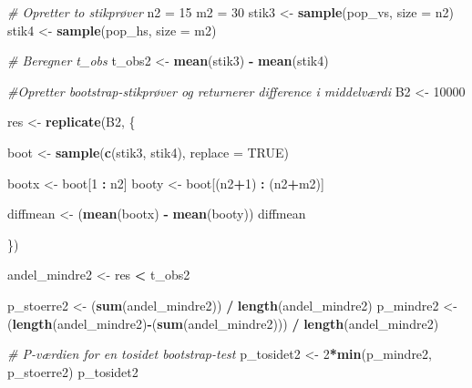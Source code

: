 \documentclass[
]{book}
\newenvironment{Shaded}{\begin{snugshade}}{\end{snugshade}}
\newcommand{\CommentTok}[1]{\textcolor[rgb]{0.56,0.35,0.01}{\textit{#1}}}
\newcommand{\DataTypeTok}[1]{\textcolor[rgb]{0.13,0.29,0.53}{#1}}
\newcommand{\DecValTok}[1]{\textcolor[rgb]{0.00,0.00,0.81}{#1}}
\newcommand{\KeywordTok}[1]{\textcolor[rgb]{0.13,0.29,0.53}{\textbf{#1}}}
\newcommand{\NormalTok}[1]{#1}
\newcommand{\OperatorTok}[1]{\textcolor[rgb]{0.81,0.36,0.00}{\textbf{#1}}}
\newcommand{\OtherTok}[1]{\textcolor[rgb]{0.56,0.35,0.01}{#1}}
\newcommand{\StringTok}[1]{\textcolor[rgb]{0.31,0.60,0.02}{#1}}
\theoremstyle{definition}
\theoremstyle{definition}
\theoremstyle{definition}
\theoremstyle{remark}
\begin{document}
\begin{Shaded}
\begin{Highlighting}[]
\CommentTok{# Opretter to stikprøver}
\NormalTok{n2 =}\StringTok{ }\DecValTok{15}
\NormalTok{m2 =}\StringTok{ }\DecValTok{30}
\NormalTok{stik3 <-}\StringTok{ }\KeywordTok{sample}\NormalTok{(pop_vs, }\DataTypeTok{size =}\NormalTok{ n2)}
\NormalTok{stik4 <-}\StringTok{ }\KeywordTok{sample}\NormalTok{(pop_hs, }\DataTypeTok{size =}\NormalTok{ m2)}

\CommentTok{# Beregner t_obs}
\NormalTok{t_obs2 <-}\StringTok{ }\KeywordTok{mean}\NormalTok{(stik3) }\OperatorTok{-}\StringTok{ }\KeywordTok{mean}\NormalTok{(stik4)}

\CommentTok{#Opretter bootstrap-stikprøver og returnerer difference i middelværdi}
\NormalTok{B2 <-}\StringTok{ }\DecValTok{10000}

\NormalTok{res <-}\StringTok{ }\KeywordTok{replicate}\NormalTok{(B2, \{}

\NormalTok{  boot <-}\StringTok{ }\KeywordTok{sample}\NormalTok{(}\KeywordTok{c}\NormalTok{(stik3, stik4), }\DataTypeTok{replace =} \OtherTok{TRUE}\NormalTok{)}

\NormalTok{  bootx <-}\StringTok{ }\NormalTok{boot[}\DecValTok{1} \OperatorTok{:}\StringTok{ }\NormalTok{n2]}
\NormalTok{  booty <-}\StringTok{ }\NormalTok{boot[(n2}\OperatorTok{+}\DecValTok{1}\NormalTok{) }\OperatorTok{:}\StringTok{ }\NormalTok{(n2}\OperatorTok{+}\NormalTok{m2)]}

\NormalTok{  diffmean <-}\StringTok{ }\NormalTok{(}\KeywordTok{mean}\NormalTok{(bootx) }\OperatorTok{-}\StringTok{ }\KeywordTok{mean}\NormalTok{(booty))}
\NormalTok{  diffmean}

\NormalTok{\})}

\NormalTok{andel_mindre2 <-}\StringTok{ }\NormalTok{res }\OperatorTok{<}\StringTok{ }\NormalTok{t_obs2}

\NormalTok{p_stoerre2 <-}\StringTok{ }\NormalTok{(}\KeywordTok{sum}\NormalTok{(andel_mindre2)) }\OperatorTok{/}\StringTok{ }\KeywordTok{length}\NormalTok{(andel_mindre2)}
\NormalTok{p_mindre2 <-}\StringTok{ }\NormalTok{(}\KeywordTok{length}\NormalTok{(andel_mindre2)}\OperatorTok{-}\NormalTok{(}\KeywordTok{sum}\NormalTok{(andel_mindre2))) }\OperatorTok{/}\StringTok{ }\KeywordTok{length}\NormalTok{(andel_mindre2)}

\CommentTok{# P-værdien for en tosidet bootstrap-test}
\NormalTok{p_tosidet2 <-}\StringTok{ }\DecValTok{2}\OperatorTok{*}\KeywordTok{min}\NormalTok{(p_mindre2, p_stoerre2)}
\NormalTok{p_tosidet2}
\end{Highlighting}
\end{Shaded}
\end{document}
